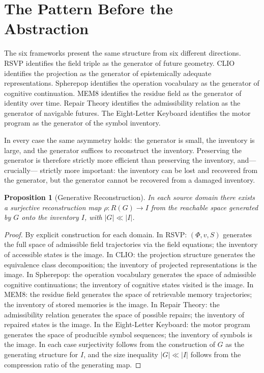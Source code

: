 \documentclass[12pt, oneside]{book}
\theoremstyle{flyxion}
\newtheorem{proposition}[theorem]{Proposition}
\theoremstyle{definition}
\begin{document}
\section{The Pattern Before the Abstraction}

The six frameworks present the same structure from six different
directions. RSVP identifies the field triple as the generator of
future geometry. CLIO identifies the projection as the generator
of epistemically adequate representations. Spherepop identifies
the operation vocabulary as the generator of cognitive continuation.
MEM\textbar{}8 identifies the residue field as the generator of
identity over time. Repair Theory identifies the admissibility
relation as the generator of navigable futures. The Eight-Letter
Keyboard identifies the motor program as the generator of the
symbol inventory.

In every case the same asymmetry holds: the generator is small,
the inventory is large, and the generator suffices to reconstruct
the inventory. Preserving the generator is therefore strictly
more efficient than preserving the inventory, and---crucially---
strictly more important: the inventory can be lost and recovered
from the generator, but the generator cannot be recovered from
a damaged inventory.

\begin{proposition}[Generative Reconstruction]
\label{prop:gen_recon}
In each source domain there exists a surjective reconstruction map
$\rho : R(G) \to I$ from the reachable space generated by $G$ onto
the inventory $I$, with $|G| \ll |I|$.
\end{proposition}

\begin{proof}
By explicit construction for each domain. In RSVP: $(\Phi, v, S)$
generates the full space of admissible field trajectories via the
field equations; the inventory of accessible states is the image.
In CLIO: the projection structure generates the equivalence class
decomposition; the inventory of projected representations is the
image. In Spherepop: the operation vocabulary generates the space
of admissible cognitive continuations; the inventory of cognitive
states visited is the image. In MEM\textbar{}8: the residue field
generates the space of retrievable memory trajectories; the inventory
of stored memories is the image. In Repair Theory: the admissibility
relation generates the space of possible repairs; the inventory of
repaired states is the image. In the Eight-Letter Keyboard: the
motor program generates the space of producible symbol sequences;
the inventory of symbols is the image. In each case surjectivity
follows from the construction of $G$ as the generating structure
for $I$, and the size inequality $|G| \ll |I|$ follows from the
compression ratio of the generating map.
\end{proof}
\end{document}
